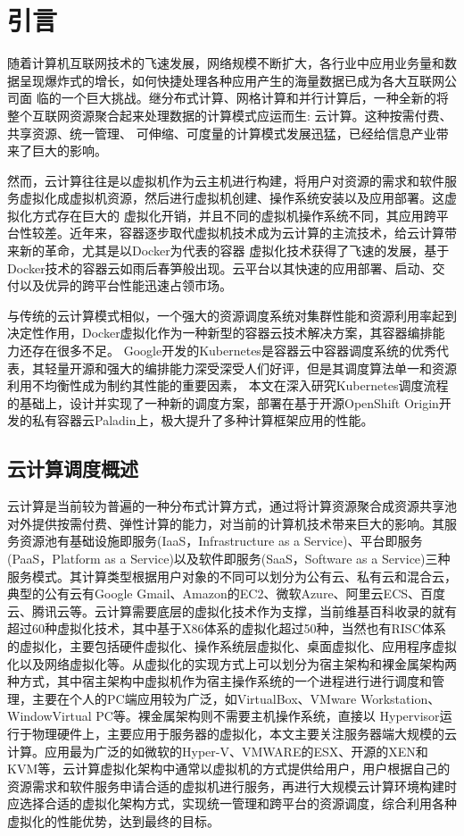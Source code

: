\chapter{引言}
\label{cha:intro}

随着计算机互联网技术的飞速发展，网络规模不断扩大，各行业中应用业务量和数据呈现爆炸式的增长，如何快捷处理各种应用产生的海量数据已成为各大互联网公司面
临的一个巨大挑战。继分布式计算、网格计算和并行计算后，一种全新的将整个互联网资源聚合起来处理数据的计算模式应运而生: 云计算。这种按需付费、共享资源、统一管理、
可伸缩、可度量的计算模式发展迅猛，已经给信息产业带来了巨大的影响。

然而，云计算往往是以虚拟机作为云主机进行构建，将用户对资源的需求和软件服务虚拟化成虚拟机资源，然后进行虚拟机创建、操作系统安装以及应用部署。这虚拟化方式存在巨大的
虚拟化开销，并且不同的虚拟机操作系统不同，其应用跨平台性较差。近年来，容器逐步取代虚拟机技术成为云计算的主流技术，给云计算带来新的革命，尤其是以Docker为代表的容器
虚拟化技术获得了飞速的发展，基于Docker技术的容器云如雨后春笋般出现。云平台以其快速的应用部署、启动、交付以及优异的跨平台性能迅速占领市场。

与传统的云计算模式相似，一个强大的资源调度系统对集群性能和资源利用率起到决定性作用，Docker虚拟化作为一种新型的容器云技术解决方案，其容器编排能力还存在很多不足。
Google开发的Kubernetes是容器云中容器调度系统的优秀代表，其轻量开源和强大的编排能力深受深受人们好评，但是其调度算法单一和资源利用不均衡性成为制约其性能的重要因素，
本文在深入研究Kubernetes调度流程的基础上，设计并实现了一种新的调度方案，部署在基于开源OpenShift Origin开发的私有容器云Paladin上，极大提升了多种计算框架应用的性能。

\section{云计算调度概述}
云计算是当前较为普遍的一种分布式计算方式，通过将计算资源聚合成资源共享池对外提供按需付费、弹性计算的能力，对当前的计算机技术带来巨大的影响。其服务资源池有基础设施即服务(IaaS，Infrastructure as a Service)、平台即服务(PaaS，Platform as a Service)以及软件即服务(SaaS，Software as a Service)三种服务模式。其计算类型根据用户对象的不同可以划分为公有云、私有云和混合云，典型的公有云有Google Gmail、Amazon的EC2、微软Azure、阿里云ECS、百度云、腾讯云等。云计算需要底层的虚拟化技术作为支撑，当前维基百科收录的就有超过60种虚拟化技术，其中基于X86体系的虚拟化超过50种，当然也有RISC体系的虚拟化，主要包括硬件虚拟化、操作系统层虚拟化、桌面虚拟化、应用程序虚拟化以及网络虚拟化等。从虚拟化的实现方式上可以划分为宿主架构和裸金属架构两种方式，其中宿主架构中虚拟机作为宿主操作系统的一个进程进行进行调度和管理，主要在个人的PC端应用较为广泛，如VirtualBox、VMware Workstation、WindowVirtual PC等。裸金属架构则不需要主机操作系统，直接以
Hypervisor运行于物理硬件上，主要应用于服务器的虚拟化，本文主要关注服务器端大规模的云计算。应用最为广泛的如微软的Hyper-V、VMWARE的ESX、开源的XEN和KVM等，云计算虚拟化架构中通常以虚拟机的方式提供给用户，用户根据自己的资源需求和软件服务申请合适的虚拟机进行服务，再进行大规模云计算环境构建时应选择合适的虚拟化架构方式，实现统一管理和跨平台的资源调度，综合利用各种虚拟化的性能优势，达到最终的目标。

